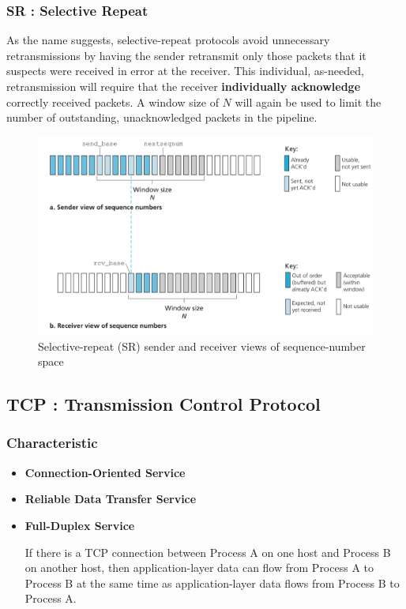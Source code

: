 \documentclass[11pt]{article}
\begin{document}
\subsubsection{SR : Selective Repeat}

As the name suggests, selective-repeat protocols avoid unnecessary retransmissions by having the sender retransmit only those packets that it suspects were received in error at the receiver. This individual, as-needed, retransmission will require that the receiver \textbf{individually acknowledge} correctly received packets. A window size of $N$ will again be used to limit the number of outstanding, unacknowledged packets in the pipeline.

\begin{figure}[h]
	\centering
	\includegraphics[width=0.8\linewidth]{images/SR.png}
	\caption{Selective-repeat (SR) sender and receiver views of sequence-number space}
	\label{fig:SR}
\end{figure}

\subsection{TCP : Transmission Control Protocol}

\subsubsection{Characteristic}

\begin{itemize}
	\item \textbf{Connection-Oriented Service}
	
	\item \textbf{Reliable Data Transfer Service}
	
	\item \textbf{Full-Duplex Service}
	
	If there is a TCP connection between Process A on one host and Process B on another host, then application-layer data can flow from Process A to Process B at the same time as application-layer data flows from Process B to Process A.
\end{itemize}
\end{document}
